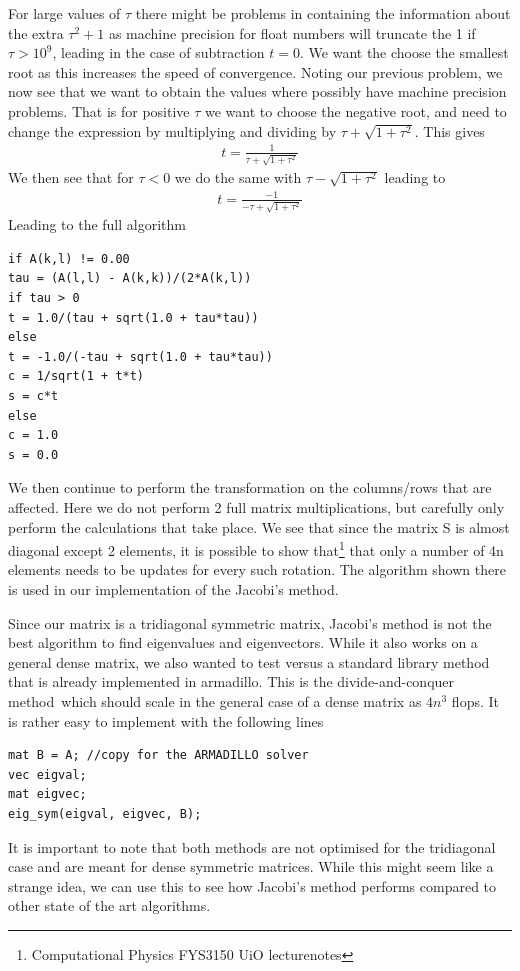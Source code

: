 \documentclass[a4paper,11pt]{article}
\begin{document}
{For large values of $\tau$ there might be problems in containing the information about the extra $\tau^2+1$ as machine precision for float numbers will truncate the 1 if $\tau> 10^9$, leading in the case of subtraction $t=0$. We want the choose the smallest root as this increases the speed of convergence. Noting our previous problem, we now see that we want to obtain the values where possibly have machine precision problems. That is for positive $\tau$ we want to choose the negative root, and need to change the expression by multiplying and dividing by $\tau +\sqrt{1+\tau^2}$. This gives
\begin{align}
t = \frac{1}{\tau+\sqrt{1+\tau^2}}
\end{align}
We then see that for $\tau<0$ we do the same with  $\tau -\sqrt{1+\tau^2}$ leading to
\begin{align}
t = \frac{-1}{-\tau+\sqrt{1+\tau^2}}
\end{align}
Leading to the full algorithm 
\begin{lstlisting}
if A(k,l) != 0.00
tau = (A(l,l) - A(k,k))/(2*A(k,l))
if tau > 0
t = 1.0/(tau + sqrt(1.0 + tau*tau))
else 
t = -1.0/(-tau + sqrt(1.0 + tau*tau))
c = 1/sqrt(1 + t*t)
s = c*t
else 
c = 1.0
s = 0.0
\end{lstlisting}

We then continue to perform the transformation on the columns/rows that are affected. Here we do not perform 2 full matrix multiplications, but carefully only perform the calculations that take place. We see that since the matrix S is almost diagonal except 2 elements, it is possible to show that\footnote{Computational Physics FYS3150 UiO lecturenotes} that only a number of 4n elements needs to be updates for every such rotation. The algorithm shown there is used in our implementation of the Jacobi's method. 

Since our matrix is a tridiagonal symmetric matrix, Jacobi's method is not the best algorithm to find eigenvalues and eigenvectors. While it also works on a general dense matrix, we also wanted to test versus a standard library method that is already implemented in armadillo. This is the divide-and-conquer method\ which should scale in the general case of a dense matrix as $4n^3$ flops\cite{Divide-and-conquer}. It is rather easy to implement with the following lines
\begin{lstlisting}
mat B = A; //copy for the ARMADILLO solver
vec eigval;
mat eigvec;
eig_sym(eigval, eigvec, B);
\end{lstlisting}
It is important to note that both methods are not optimised for the tridiagonal case and are meant for dense symmetric matrices. While this might seem like a strange idea, we can use this to see how Jacobi's method performs compared to other state of the art algorithms. 








}
\end{document}
